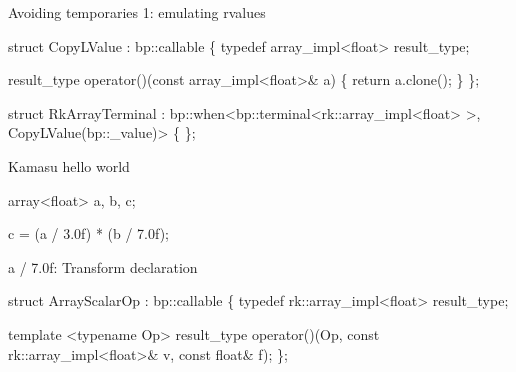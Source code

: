 
\begin{frame}[fragile]{Avoiding temporaries 1: emulating rvalues}
\begin{semiverbatim}
struct \alert<2>{CopyLValue} : bp::callable
\{
  typedef array_impl<float> result_type;

  result_type
  operator()(const array_impl<float>& a)
  \{
    return a.clone();
  \}
\};


struct RkArrayTerminal 
  : bp::when<bp::terminal<rk::array_impl<float> >, 
             CopyLValue(bp::_value)>
\{ \};


\end{semiverbatim}
\note{

}
\end{frame}


\begin{frame}[fragile]{Kamasu hello world}
\begin{semiverbatim}

array<float> a, b, c;

\alert<2>{c = (a / 3.0f) * (b / 7.0f);}

\end{semiverbatim}
\note{

}
\end{frame}

\begin{frame}[fragile]{a / 7.0f:  Transform declaration}
\begin{semiverbatim}

struct ArrayScalarOp : bp::callable
\{
  typedef rk::array_impl<float> result_type;

  template <typename Op>
  result_type 
  operator()(Op, const rk::array_impl<float>& v, const float& f);
\};


\end{semiverbatim}
\end{frame}

